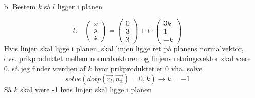 \documentclass[12pt]{article}
\begin{document}
\begin{enumerate}
        \item[b.] Bestem $k$ så $l$ ligger i planen

                $$l:~~~~\begin{pmatrix} x \\ y \\ z \end{pmatrix} =
                        \begin{pmatrix} 0 \\ 3 \\ 3 \end{pmatrix} +
                        t \cdot \begin{pmatrix} 3k \\ 1 \\ -k \end{pmatrix}$$
                Hvis linjen skal ligge i planen, skal linjen ligge ret på 
                planens normalvektor, dvs. prikproduktet mellem normalvektoren
                og linjens retningsvektor skal være 0. så jeg finder værdien
                af $k$ hvor prikproduktet er 0 vha. solve
                $$solve(dotp(\vec{r_l}, \vec{n_{\alpha}})=0,k) \rightarrow k=-1$$
                Så $k$ skal være -1 hvis linjen skal ligge i planen

\end{enumerate}
\end{document}
